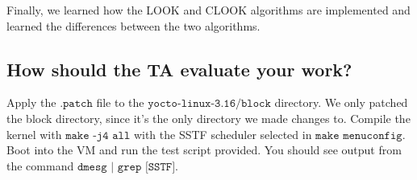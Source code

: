 \documentclass[letterpaper,10pt,titlepage]{article}
\begin{document}
Finally, we learned how the LOOK and CLOOK algorithms are implemented and learned the differences between the two algorithms.

\subsection{How should the TA evaluate your work?}
Apply the $\texttt{.patch}$ file to the $\texttt{yocto-linux-3.16/block}$ directory. We only patched the block directory, since it's the only directory we made changes to.
Compile the kernel with $\texttt{make -j4 all}$ with the SSTF scheduler selected in $\texttt{make menuconfig}$. Boot into the VM and run the test script provided. You should see output from the command $\texttt{dmesg | grep [SSTF]}$.
\end{document}
